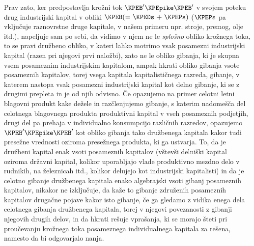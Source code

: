 \documentclass[kapital_02.tex]{subfiles}
\begin{document}
Prav zato, ker predpostavlja krožni tok \( \KPEB' \KPEpike \KPEB' \) v svojem poteku drug industrijski kapital v obliki \( \KPEB ( \textrm{= } \KPEDs \textrm{ + } \KPEPs ) \) (\( \KPEPs \) pa vključuje raznovrstne druge kapitale, v našem primeru npr. stroje, premog, olje itd.), napeljuje sam po sebi, da vidimo v njem ne le \emph{splošno} obliko krožnega toka, to se pravi družbeno obliko, v kateri lahko motrimo vsak posamezni industrijski kapital (razen pri njegovi prvi naložbi), zato ne le obliko gibanja, ki je skupna vsem posameznim industrijskim \KPEstran kapitalom, ampak hkrati obliko gibanja vsote posameznih kapitalov, torej vsega kapitala kapitalističnega razreda, gibanje, v katerem nastopa vsak posamezni industrijski kapital kot delno gibanje, ki se z drugimi prepleta in je od njih odvisno. Če opazujemo na primer celotni letni blagovni produkt kake dežele in razčlenjujemo gibanje, s katerim nadomešča del celotnega blagovnega produkta produktivni kapital v vseh posameznih podjetjih, drugi del pa prehaja v individualno konsumpcijo različnih razredov, opazujemo \( \KPEB' \KPEpike \KPEB' \) kot obliko gibanja tako družbenega kapitala kakor tudi presežne vrednosti oziroma presežnega produkta, ki ga ustvarja. To, da je družbeni kapital enak vsoti posameznih kapitalov (vštevši delniški kapital oziroma državni kapital, kolikor uporabljajo vlade produktivno mezdno delo v rudnikih, na železnicah itd., kolikor delujejo kot industrijski kapitalisti) in da je celotno gibanje družbenega kapitala enako algebrajski vsoti gibanj posameznih kapitalov, nikakor ne izključuje, da kaže to gibanje združenih posameznih kapitalov drugačne pojave kakor isto gibanje, če ga gledamo z vidika enega dela celotnega gibanja družbenega kapitala, torej v njegovi povezanosti z gibanji njegovih drugih delov, in da hkrati rešuje vprašanja, ki se morajo šteti pri proučevanju krožnega toka posameznega individualnega kapitala za rešena, namesto da bi odgovarjalo nanja.
\end{document}
